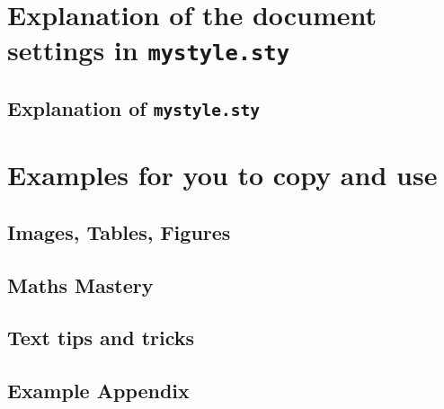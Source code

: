 \documentclass[a4paper,12pt,twoside]{report}
\begin{document}
\pagestyle{plain} %






\newpage

\newpage
\setcounter{page}{4}
\tableofcontents
\newpage


\pagestyle{exciting} %
\newpage




\part[Document settings explanation]{Explanation of the document settings in \texttt{mystyle.sty}}\label{part:part1}


\chapter{Explanation of \texttt{mystyle.sty}}\label{ch:explanation}



\part[Examples and explanations]{Examples for you to copy and use}

\chapter{Images, Tables, Figures}


\chapter{Maths Mastery}


\chapter{Text tips and tricks}



\newpage
\printbibliography

\newpage
\appendix
\chapter{Example Appendix}


\end{document}
